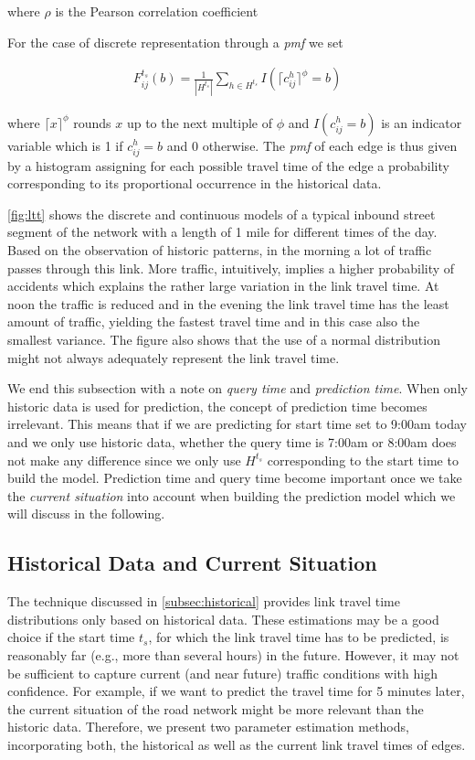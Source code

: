 where $\rho$ is the Pearson correlation coefficient \cite{Soper17}

For the case of discrete representation through a \textit{pmf} we set

\begin{gather}
  F_{ij}^{t_s}(b) = \frac{1}{|H^{t_s}|}\sum_{h\in H^{t_s}} I(\lceil c_{ij}^h \rceil^\phi= b)
\end{gather}

where $\lceil x \rceil^\phi$ rounds $x$ up to the next multiple of $\phi$ and $I(c_{ij}^h = b)$ is an indicator variable which is 1 if $c_{ij}^h = b$ and 0 otherwise. The \textit{pmf} of each edge is thus given by a histogram assigning for each possible travel time of the edge a probability corresponding to its proportional occurrence in the historical data. 

\cref{fig:ltt} shows the discrete and continuous models of a typical inbound street segment of the network with a length of 1 mile for different times of the day. Based on the observation of historic patterns, in the morning a lot of traffic passes through this link. More traffic, intuitively, implies a higher probability of accidents which explains the rather large variation in the link travel time. At noon the traffic is reduced and in the evening the link travel time has the least amount of traffic, yielding the fastest travel time and in this case also the smallest variance. The figure also shows that the use of a normal distribution might not always adequately represent the link travel time.

We end this subsection with a note on \textit{query time} and \textit{prediction time}. When only historic data is used for prediction, the concept of prediction time becomes irrelevant. This means that if we are predicting for start time set to 9:00am today and we only use historic data, whether the query time is 7:00am or 8:00am does not make any difference since we only use $H^{t_s}$ corresponding to the start time to build the model. Prediction time and query time become important once we take the \textit{current situation} into account when building the prediction model which we will discuss in the following. 

\subsection{Historical Data and Current Situation}
The technique discussed in \cref{subsec:historical} provides link travel time distributions only based on historical data. These estimations may be a good choice if the start time $t_s$, for which the link travel time has to be predicted, is reasonably far (e.g., more than several hours) in the future. However, it may not be sufficient to capture current (and near future) traffic conditions with high confidence. For example, if we want to predict the travel time for 5 minutes later, the current situation of the road network might be more relevant than the historic data. Therefore, we present two parameter estimation methods, incorporating both, the historical as well as the current link travel times of edges.

